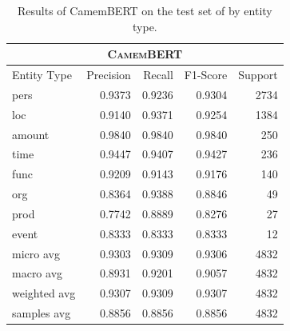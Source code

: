 \begin{table}[ht!]
    \centering\small
    \begin{tabular}{lrrrr}
        \toprule
        \multicolumn{5}{c}{\textsc{CamemBERT}}                 \\
        \midrule
        Entity Type  & Precision & Recall & F1-Score & Support \\
        \midrule
        pers         & 0.9373    & 0.9236 & 0.9304   & 2734    \\
        loc          & 0.9140    & 0.9371 & 0.9254   & 1384    \\
        amount       & 0.9840    & 0.9840 & 0.9840   & 250     \\
        time         & 0.9447    & 0.9407 & 0.9427   & 236     \\
        func         & 0.9209    & 0.9143 & 0.9176   & 140     \\
        org          & 0.8364    & 0.9388 & 0.8846   & 49      \\
        prod         & 0.7742    & 0.8889 & 0.8276   & 27      \\
        event        & 0.8333    & 0.8333 & 0.8333   & 12      \\
        \midrule
        micro avg    & 0.9303    & 0.9309 & 0.9306   & 4832    \\
        macro avg    & 0.8931    & 0.9201 & 0.9057   & 4832    \\
        weighted avg & 0.9307    & 0.9309 & 0.9307   & 4832    \\
        samples avg  & 0.8856    & 0.8856 & 0.8856   & 4832    \\
        \bottomrule
    \end{tabular}
    \caption{Results of CamemBERT on the test set of \freemner by entity type.}
\end{table}

